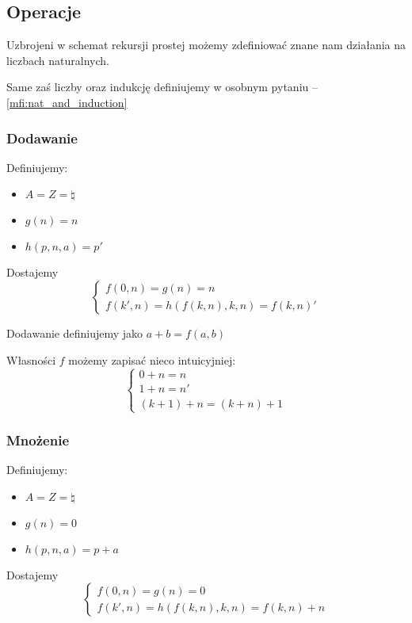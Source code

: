\subsection{Operacje}

Uzbrojeni w schemat rekursji prostej możemy zdefiniować znane nam działania na liczbach naturalnych.

Same zaś liczby oraz indukcję definiujemy w osobnym pytaniu -- \ref{mfi:nat_and_induction}

\subsubsection{Dodawanie}

Definiujemy:
\begin{itemize}
    \item \( A = Z = \natural \)
    \item \( g(n) = n \)
    \item \( h(p, n, a) = p' \)
\end{itemize}

Dostajemy
\[
    \begin{cases}
        f(0, n) = g(n) = n \\
        f(k', n) = h(f(k, n), k, n) = f(k, n)'
    \end{cases}
\]

Dodawanie definiujemy jako \( a + b = f(a, b) \)

Własności \( f \) możemy zapisać nieco intuicyjniej:
\[
    \begin{cases}
        0 + n = n \\
        1 + n = n' \\
        (k + 1) + n = (k + n) + 1
    \end{cases}
\]


\subsubsection{Mnożenie}
Definiujemy:
\begin{itemize}
    \item \( A = Z = \natural \)
    \item \( g(n) = 0 \)
    \item \( h(p, n, a) = p + a \)
\end{itemize}

Dostajemy
\[
    \begin{cases}
        f(0, n) = g(n) = 0 \\
        f(k', n) = h(f(k, n), k, n) = f(k, n) + n
    \end{cases}
\]

